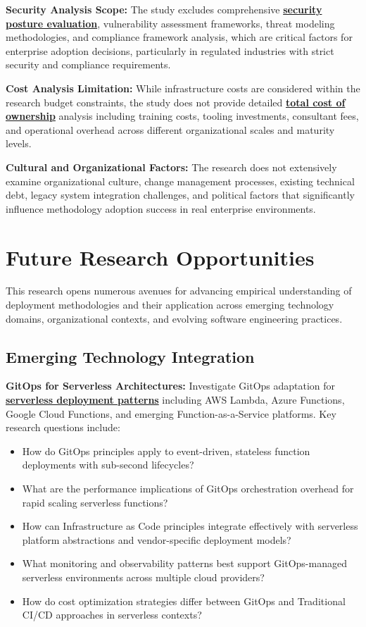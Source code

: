 \textbf{Security Analysis Scope:} The study excludes comprehensive \textbf{\hyperref[security_evaluation]{security posture evaluation}}, vulnerability assessment frameworks, threat modeling methodologies, and compliance framework analysis, which are critical factors for enterprise adoption decisions, particularly in regulated industries with strict security and compliance requirements.

\textbf{Cost Analysis Limitation:} While infrastructure costs are considered within the research budget constraints, the study does not provide detailed \textbf{\hyperref[tco_analysis]{total cost of ownership}} analysis including training costs, tooling investments, consultant fees, and operational overhead across different organizational scales and maturity levels.

\textbf{Cultural and Organizational Factors:} The research does not extensively examine organizational culture, change management processes, existing technical debt, legacy system integration challenges, and political factors that significantly influence methodology adoption success in real enterprise environments.

\section{Future Research Opportunities}
\label{sec:future_research}

This research opens numerous avenues for advancing empirical understanding of deployment methodologies and their application across emerging technology domains, organizational contexts, and evolving software engineering practices.

\subsection{Emerging Technology Integration}
\label{subsec:emerging_technology}

\textbf{GitOps for Serverless Architectures:} Investigate GitOps adaptation for \textbf{\hyperref[serverless_computing]{serverless deployment patterns}} including AWS Lambda, Azure Functions, Google Cloud Functions, and emerging Function-as-a-Service platforms. Key research questions include:
\begin{itemize}
\item How do GitOps principles apply to event-driven, stateless function deployments with sub-second lifecycles?
\item What are the performance implications of GitOps orchestration overhead for rapid scaling serverless functions?
\item How can Infrastructure as Code principles integrate effectively with serverless platform abstractions and vendor-specific deployment models?
\item What monitoring and observability patterns best support GitOps-managed serverless environments across multiple cloud providers?
\item How do cost optimization strategies differ between GitOps and Traditional CI/CD approaches in serverless contexts?
\end{itemize}

